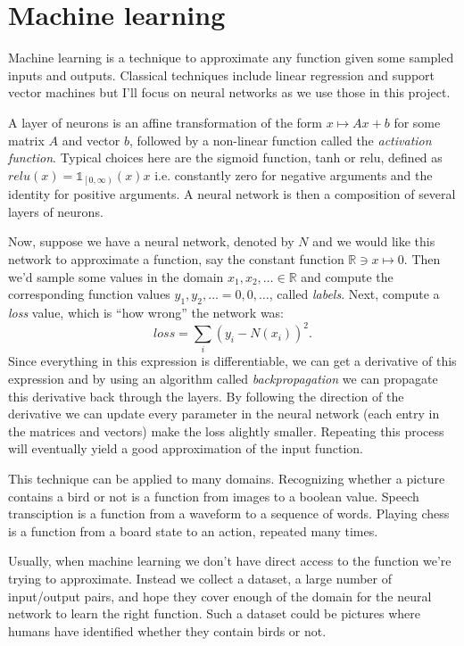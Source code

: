 \documentclass{article}
\theoremstyle{changedot}
\theoremstyle{changedotbreak}
\theoremstyle{nonumberplain}
\newcommand{\m}{\mathbb}
\begin{document}
\section{Machine learning}
Machine learning is a technique to approximate any function given some sampled inputs and outputs. Classical techniques include linear regression and support vector machines but I'll focus on neural networks as we use those in this project.

A layer of neurons is an affine transformation of the form $x \mapsto Ax + b$ for some matrix $A$ and vector $b$, followed by a non-linear function called the \emph{activation function}. Typical choices here are the sigmoid function, tanh or relu, defined as $relu(x) = \mathds{1}_{\left[0,\infty\right)}(x) x$ i.e. constantly zero for negative arguments and the identity for positive arguments. A neural network is then a composition of several layers of neurons.

Now, suppose we have a neural network, denoted by $N$ and we would like this network to approximate a function, say the constant function $\m R \ni x \mapsto 0$. Then we'd sample some values in the domain $x_{1}, x_{2}, \dots \in \m R$ and compute the corresponding function values $y_{1}, y_{2}, \dots = 0, 0, \dots$, called \emph{labels}. Next, compute a \emph{loss} value, which is ``how wrong'' the network was: \[loss = \sum_{i} (y_{i} - N(x_{i}))^{2}.\] Since everything in this expression is differentiable, we can get a derivative of this expression and by using an algorithm called \emph{backpropagation} we can propagate this derivative back through the layers. By following the direction of the derivative we can update every parameter in the neural network (each entry in the matrices and vectors) make the loss alightly smaller. Repeating this process will eventually yield a good approximation of the input function.

This technique can be applied to many domains. Recognizing whether a picture contains a bird or not is a function from images to a boolean value. Speech transciption is a function from a waveform to a sequence of words. Playing chess is a function from a board state to an action, repeated many times.

Usually, when machine learning we don't have direct access to the function we're trying to approximate. Instead we collect a dataset, a large number of input/output pairs, and hope they cover enough of the domain for the neural network to learn the right function. Such a dataset could be pictures where humans have identified whether they contain birds or not.
\end{document}
